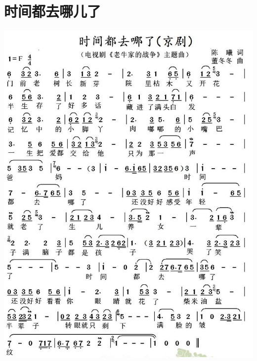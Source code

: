 \documentclass[cn,pad,chinesefont=nofont]{elegantbook}
\begin{document}
\section{时间都去哪儿了}
    \includegraphics[width=\textwidth]{dongxiao/20200411-时间都去哪儿了.jpg} 
\end{document}
